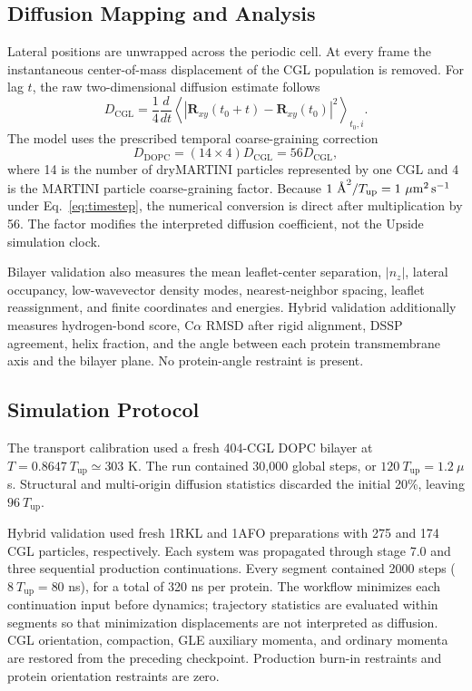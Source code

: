 \documentclass{article}
\newcommand{\angstrom}{\text{\normalfont\AA}}
\begin{document}
\subsection{Diffusion Mapping and Analysis}

Lateral positions are unwrapped across the periodic cell.  At every frame the
instantaneous center-of-mass displacement of the CGL population is removed.
For lag $t$, the raw two-dimensional diffusion estimate follows
\begin{equation}
D_{\mathrm{CGL}}=\frac{1}{4}\frac{d}{dt}
\left\langle|\mathbf R_{xy}(t_0+t)-\mathbf R_{xy}(t_0)|^2\right\rangle_{t_0,i}.
\label{eq:diffusion}
\end{equation}
The model uses the prescribed temporal coarse-graining correction
\begin{equation}
D_{\mathrm{DOPC}}=(14\times4)D_{\mathrm{CGL}}=56D_{\mathrm{CGL}},
\label{eq:cg_factor}
\end{equation}
where 14 is the number of dryMARTINI particles represented by one CGL and 4 is
the MARTINI particle coarse-graining factor.  Because
$1~\angstrom^2/T_{\mathrm{up}}=1~\mu\mathrm{m}^2\,\mathrm{s}^{-1}$ under
Eq.~\ref{eq:timestep}, the numerical conversion is direct after multiplication
by 56.  The factor modifies the interpreted diffusion coefficient, not the
Upside simulation clock.

Bilayer validation also measures the mean leaflet-center separation,
$|n_z|$, lateral occupancy, low-wavevector density modes, nearest-neighbor
spacing, leaflet reassignment, and finite coordinates and energies.  Hybrid
validation additionally measures hydrogen-bond score, C$\alpha$ RMSD after
rigid alignment, DSSP agreement, helix fraction, and the angle between each
protein transmembrane axis and the bilayer plane.  No protein-angle restraint
is present.

\subsection{Simulation Protocol}

The transport calibration used a fresh 404-CGL DOPC bilayer at
$T=0.8647~T_{\mathrm{up}}\simeq303$ K.  The run contained 30,000 global steps,
or $120~T_{\mathrm{up}}=1.2~\mu$s.  Structural and multi-origin diffusion
statistics discarded the initial 20\%, leaving $96~T_{\mathrm{up}}$.

Hybrid validation used fresh 1RKL and 1AFO preparations with 275 and 174 CGL
particles, respectively.  Each system was propagated through stage 7.0 and
three sequential production continuations.  Every segment contained 2000
steps ($8~T_{\mathrm{up}}=80$ ns), for a total of 320 ns per protein.  The
workflow minimizes each continuation input before dynamics;
trajectory statistics are evaluated within segments so that minimization
displacements are not interpreted as diffusion.  CGL orientation, compaction,
GLE auxiliary momenta, and ordinary momenta are restored from the preceding
checkpoint.  Production burn-in restraints and protein orientation restraints
are zero.
\end{document}
